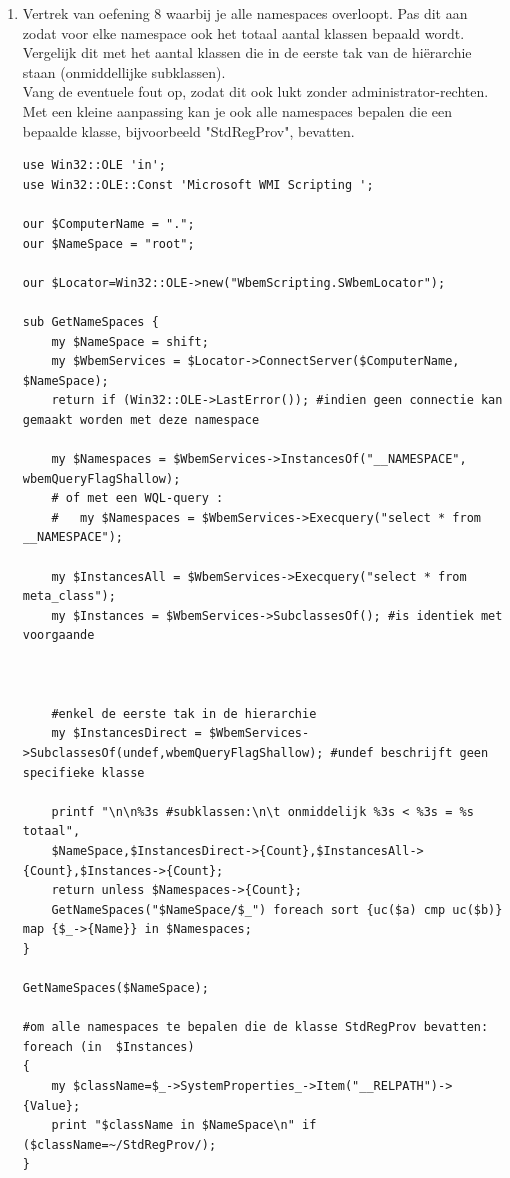 \documentclass[11pt,a4paper]{report}
\begin{document}
\begin{enumerate}[resume]
	\item Vertrek van oefening 8 waarbij je alle namespaces overloopt. Pas dit aan zodat voor elke namespace ook het totaal aantal klassen bepaald wordt. Vergelijk dit met het aantal klassen die in de eerste tak van de hiërarchie staan (onmiddellijke subklassen).
	\\Vang de eventuele fout op, zodat dit ook lukt zonder administrator-rechten.
	\\ Met een kleine aanpassing kan je ook alle namespaces bepalen die een bepaalde klasse, bijvoorbeeld "StdRegProv", bevatten.
	\begin{lstlisting}
use Win32::OLE 'in';
use Win32::OLE::Const 'Microsoft WMI Scripting ';

our $ComputerName = ".";
our $NameSpace = "root";

our $Locator=Win32::OLE->new("WbemScripting.SWbemLocator");

sub GetNameSpaces {
	my $NameSpace = shift;
	my $WbemServices = $Locator->ConnectServer($ComputerName, $NameSpace);
	return if (Win32::OLE->LastError()); #indien geen connectie kan gemaakt worden met deze namespace
	
	my $Namespaces = $WbemServices->InstancesOf("__NAMESPACE", wbemQueryFlagShallow);
	# of met een WQL-query :
	#   my $Namespaces = $WbemServices->Execquery("select * from __NAMESPACE");
	
	my $InstancesAll = $WbemServices->Execquery("select * from meta_class"); 
	my $Instances = $WbemServices->SubclassesOf(); #is identiek met voorgaande
	
	
	
	#enkel de eerste tak in de hierarchie
	my $InstancesDirect = $WbemServices->SubclassesOf(undef,wbemQueryFlagShallow); #undef beschrijft geen specifieke klasse
	
	printf "\n\n%3s #subklassen:\n\t onmiddelijk %3s < %3s = %s totaal",
	$NameSpace,$InstancesDirect->{Count},$InstancesAll->{Count},$Instances->{Count};
	return unless $Namespaces->{Count};
	GetNameSpaces("$NameSpace/$_") foreach sort {uc($a) cmp uc($b)} map {$_->{Name}} in $Namespaces;
}

GetNameSpaces($NameSpace);

#om alle namespaces te bepalen die de klasse StdRegProv bevatten:
foreach (in  $Instances)  
{
	my $className=$_->SystemProperties_->Item("__RELPATH")->{Value};
	print "$className in $NameSpace\n" if ($className=~/StdRegProv/);
}


\end{lstlisting}
\end{enumerate}
\end{document}
